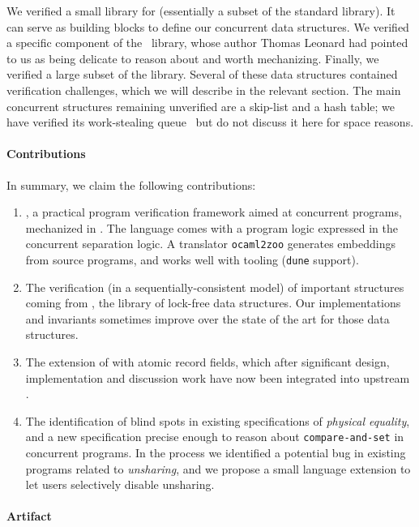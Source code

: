 We verified a small library for \ZooLang (essentially a subset of the \OCaml standard library).
It can serve as building blocks to define our concurrent data structures.
We verified a specific component of the \Eio~library, whose author Thomas Leonard had pointed to us as being delicate to reason about and worth mechanizing.
Finally, we verified a large subset of the \Saturn library.
Several of these data structures contained verification challenges, which we will describe in the relevant section.
The main \Saturn concurrent structures remaining unverified are a skip-list and a hash table; we have verified its work-stealing queue~\citep*{DBLP:conf/spaa/ChaseL05} but do not discuss it here for space reasons.

\paragraph{Contributions}

In summary, we claim the following contributions:
\begin{enumerate}
  \item
    \Zoo, a practical program verification framework aimed at concurrent \OCaml programs, mechanized in \Rocq.
    The language \ZooLang comes with a program logic expressed in the \Iris concurrent separation logic.
    A translator \texttt{ocaml2zoo} generates \Rocq embeddings from source \OCaml programs, and works well with \OCaml tooling (\texttt{dune} support).
  \item
    The verification (in a sequentially-consistent model) of important structures coming from \Saturn, the \OCamlFive library of lock-free data structures.
    Our implementations and invariants sometimes improve over the \Iris state of the art for those data structures.
  \item
    The extension of \OCaml with atomic record fields, which after significant design, implementation and discussion work have now been integrated into upstream \OCaml.
  \item
    The identification of blind spots in existing specifications of \emph{physical equality}, and a new specification precise enough to reason about \texttt{compare-and-set} in concurrent programs.
    In the process we identified a potential bug in existing \OCaml programs related to \emph{unsharing}, and we propose a small language extension to let users selectively disable unsharing.
\end{enumerate}

\paragraph{Artifact}

